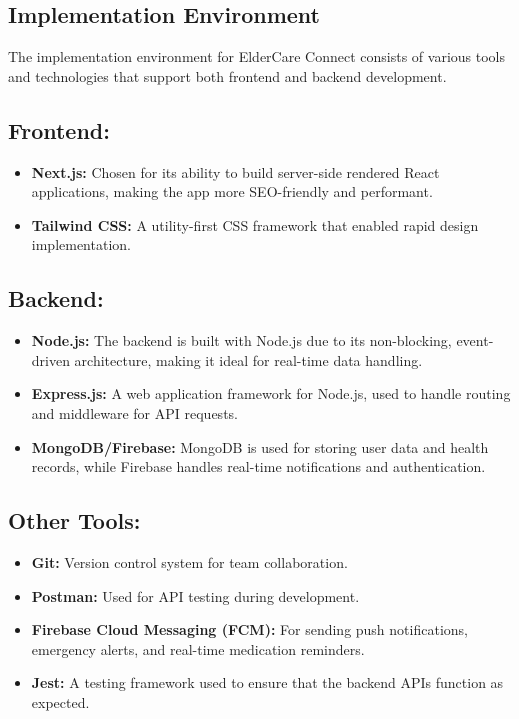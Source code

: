 \documentclass[a4paper, 12pt]{article}
\begin{document}
\subsection{Implementation Environment}

The implementation environment for ElderCare Connect consists of various tools and technologies that support both frontend and backend development.

\subsection*{Frontend:}
\begin{itemize}
    \item \textbf{Next.js:} Chosen for its ability to build server-side rendered React applications, making the app more SEO-friendly and performant.
    \item \textbf{Tailwind CSS:} A utility-first CSS framework that enabled rapid design implementation.
\end{itemize}

\subsection*{Backend:}
\begin{itemize}
    \item \textbf{Node.js:} The backend is built with Node.js due to its non-blocking, event-driven architecture, making it ideal for real-time data handling.
    \item \textbf{Express.js:} A web application framework for Node.js, used to handle routing and middleware for API requests.
    \item \textbf{MongoDB/Firebase:} MongoDB is used for storing user data and health records, while Firebase handles real-time notifications and authentication.
\end{itemize}

\subsection*{Other Tools:}
\begin{itemize}
    \item \textbf{Git:} Version control system for team collaboration.
    \item \textbf{Postman:} Used for API testing during development.
    \item \textbf{Firebase Cloud Messaging (FCM):} For sending push notifications, emergency alerts, and real-time medication reminders.
    \item \textbf{Jest:} A testing framework used to ensure that the backend APIs function as expected.
\end{itemize}
\end{document}
